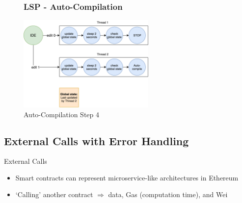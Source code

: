 \documentclass[aspectratio=169]{beamer}
\begin{document}
\begin{frame}
\begin{figure}
\frametitle{LSP - Auto-Compilation}
    \centering
    \includegraphics[width=0.6\textwidth]{figures/lsp-step-4.png}
    \caption*{Auto-Compilation Step 4}
\end{figure}
\end{frame}

\subsection{External Calls with Error Handling}

\begin{frame}{External Calls}
    \begin{itemize}
        \item Smart contracts can represent microservice-like architectures in Ethereum
        \item `Calling' another contract \(\Rightarrow\) data, Gas (computation time), and Wei
    \end{itemize}
\end{frame}
\end{document}
